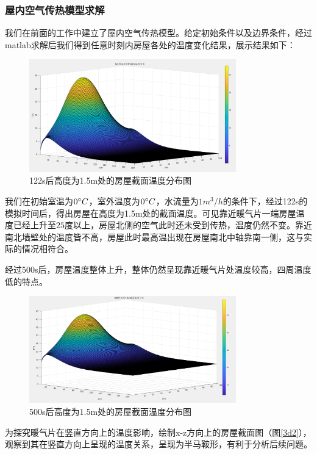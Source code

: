 \documentclass{my_paper}
\begin{document}
\subsubsection{屋内空气传热模型求解}

我们在前面的工作中建立了屋内空气传热模型。给定初始条件以及边界条件，经过matlab求解后我们得到任意时刻内房屋各处的温度变化结果，展示结果如下：
\newpage
\begin {figure}[h]
\centering %
\includegraphics[width=0.8\textwidth]{3d.png}
\caption{122s后高度为1.5m处的房屋截面温度分布图} %
\label{3d}
\end {figure}

我们在初始室温为$0\degree C$，室外温度为$0\degree C$，水流量为$1 m^3/h$的条件下，经过122s的模拟时间后，得出房屋在高度为1.5m处的截面温度。可见靠近暖气片一端房屋温度已经上升至$25$度以上，房屋北侧的空气此时还未受到传热，温度仍然不变。靠近南北墙壁处的温度皆不高，房屋此时最高温出现在房屋南北中轴靠南一侧，这与实际的情况相符合。

经过500s后，房屋温度整体上升，整体仍然呈现靠近暖气片处温度较高，四周温度低的特点。

\begin {figure}[h]
\centering %
\includegraphics[width=0.8\textwidth]{3d2.png}
\caption{500s后高度为1.5m处的房屋截面温度分布图} %
\label{five}
\end {figure}

为探究暖气片在竖直方向上的温度影响，绘制x-z方向上的房屋截面图（图\ref{3d2}），观察到其在竖直方向上呈现的温度关系，呈现为半马鞍形，有利于分析后续问题。
\end{document}
